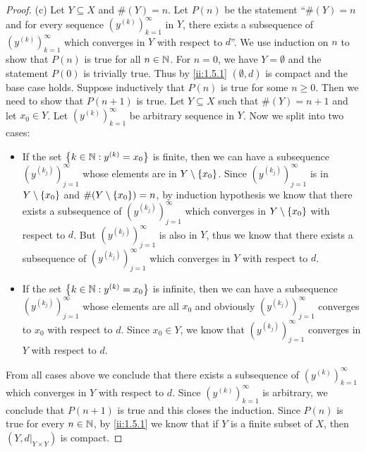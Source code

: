 \begin{proof}{(c)}
  Let \(Y \subseteq X\) and \(\#(Y) = n\).
  Let \(P(n)\) be the statement ``\(\#(Y) = n\) and for every sequence \((y^{(k)})_{k = 1}^\infty\) in \(Y\), there exists a subsequence of \((y^{(k)})_{k = 1}^\infty\) which converges in \(Y\) with respect to \(d\)''.
  We use induction on \(n\) to show that \(P(n)\) is true for all \(n \in \mathbb{N}\).
  For \(n = 0\), we have \(Y = \emptyset\) and the statement \(P(0)\) is trivially true.
  Thus by \cref{ii:1.5.1} \((\emptyset, d)\) is compact and the base case holds.
  Suppose inductively that \(P(n)\) is true for some \(n \geq 0\).
  Then we need to show that \(P(n + 1)\) is true.
  Let \(Y \subseteq X\) such that \(\#(Y) = n + 1\) and let \(x_0 \in Y\).
  Let \((y^{(k)})_{k = 1}^\infty\) be arbitrary sequence in \(Y\).
  Now we split into two cases:
  \begin{itemize}
    \item If the set \(\left\lbrace k \in \mathbb{N} : y^{(k)} = x_0\right\rbrace\) is finite, then we can have a subsequence \((y^{(k_j)})_{j = 1}^\infty\) whose elements are in \(Y \setminus \left\lbrace x_0\right\rbrace\).
          Since \((y^{(k_j)})_{j = 1}^\infty\) is in \(Y \setminus \left\lbrace x_0\right\rbrace\) and \(\#(Y \setminus \left\lbrace x_0\right\rbrace) = n\), by induction hypothesis we know that there exists a subsequence of \((y^{(k_j)})_{j = 1}^\infty\) which converges in \(Y \setminus \left\lbrace x_0\right\rbrace\) with respect to \(d\).
          But \((y^{(k_j)})_{j = 1}^\infty\) is also in \(Y\), thus we know that there exists a subsequence of \((y^{(k_j)})_{j = 1}^\infty\) which converges in \(Y\) with respect to \(d\).
    \item If the set \(\left\lbrace k \in \mathbb{N} : y^{(k)} = x_0\right\rbrace\) is infinite, then we can have a subsequence \((y^{(k_j)})_{j = 1}^\infty\) whose elements are all \(x_0\) and obviously \((y^{(k_j)})_{j = 1}^\infty\) converges to \(x_0\) with respect to \(d\).
          Since \(x_0 \in Y\), we know that \((y^{(k_j)})_{j = 1}^\infty\) converges in \(Y\) with respect to \(d\).
  \end{itemize}
  From all cases above we conclude that there exists a subsequence of \((y^{(k)})_{k = 1}^\infty\) which converges in \(Y\) with respect to \(d\).
  Since \((y^{(k)})_{k = 1}^\infty\) is arbitrary, we conclude that \(P(n + 1)\) is true and this closes the induction.
  Since \(P(n)\) is true for every \(n \in \mathbb{N}\), by \cref{ii:1.5.1} we know that if \(Y\) is a finite subset of \(X\), then \((Y, d|_{Y \times Y})\) is compact.
\end{proof}

\exercisesection

